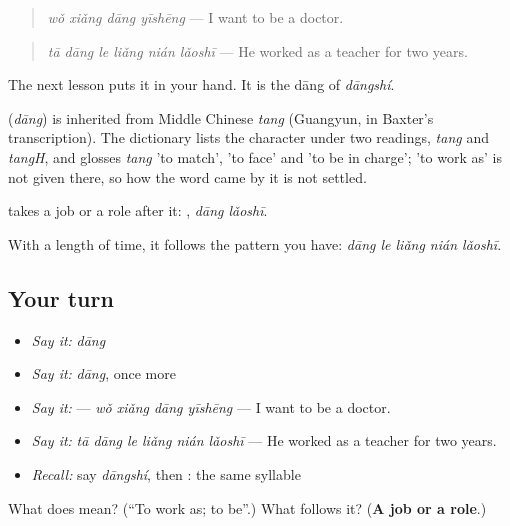 \begin{quote}
\textbf{} \emph{wǒ xiǎng dāng yīshēng} — I want to be a doctor.
\end{quote}

\begin{quote}
\emph{tā dāng le liǎng nián lǎoshī} — He worked as a teacher for two years.
\end{quote}

The next lesson puts it in your hand. It is the dāng of \emph{dāngshí}.

\begin{cousinweb}
\textbf{} (\emph{dāng}) is inherited from Middle Chinese \emph{tang} (Guangyun, in Baxter's transcription). The dictionary lists the character under two readings, \emph{tang} and \emph{tangH}, and glosses \emph{tang} 'to match', 'to face' and 'to be in charge'; 'to work as' is not given there, so how the word came by it is not settled.
\end{cousinweb}

\begin{grammarlens}[title={What you've built}]
 takes a job or a role after it: , \emph{dāng lǎoshī}.

With a length of time, it follows the pattern you have: \emph{dāng le liǎng nián lǎoshī}.
\end{grammarlens}

\subsection*{Your turn}
\begin{itemize}
\raggedright
  \item \emph{Say it:} \emph{dāng}
  \item \emph{Say it:} \emph{dāng}, once more
  \item \emph{Say it:}  — \emph{wǒ xiǎng dāng yīshēng} — I want to be a doctor.
  \item \emph{Say it:} \emph{tā dāng le liǎng nián lǎoshī} — He worked as a teacher for two years.
  \item \emph{Recall:} say \emph{dāngshí}, then : the same syllable
\end{itemize}

\begin{tcolorbox}[breakable,colback=teal!4,colframe=teal!35!black,title={Before you move on}]
What does  mean? (\textquotedblleft{}To work as; to be\textquotedblright{}.) What follows it? (\textbf{A job or a role}.)
\end{tcolorbox}
